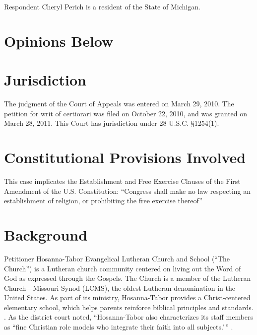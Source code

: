 \documentclass[12pt,\documentclassflag]{michiganCourtOfAppealsBrief}
\begin{document}
\noindent{}Respondent Cheryl Perich is a resident of the State of Michigan.  

\section{Opinions Below} 

\section{Jurisdiction} 
The judgment of the Court of Appeals was entered on March 29, 2010. The petition for writ of certiorari was filed on October 22, 2010, and was granted on March 28, 2011. This Court has jurisdiction under 28 U.S.C. \S 1254(1).

\section{Constitutional Provisions Involved} 
This case implicates the Establishment and Free Exercise Clauses of the First Amendment of the U.S. Constitution: ``Congress shall make no law respecting an establishment of religion, or prohibiting the free exercise thereof\ldotss''

\section{Background} 

Petitioner Hosanna-Tabor Evangelical Lutheran Church and School (``The Church'') is a Lutheran church community centered on living out the Word of God as expressed through the Gospels. The Church is a member of the Lutheran Church---Missouri Synod (LCMS), the oldest Lutheran denomination in the United States.  As part of its ministry, Hosanna-Tabor provides a Christ-centered elementary school, which helps parents reinforce biblical principles and standards. \See {}.  As the district court noted, ``Hosanna-Tabor also characterizes its staff members as ``fine Christian role models who integrate their faith into all subjects.'\,'' . 
\end{document}
